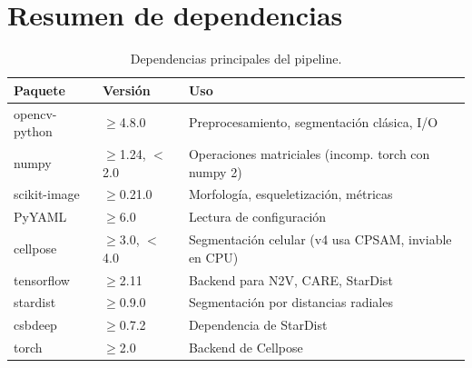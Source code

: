 \documentclass[11pt,a4paper]{article}
\begin{document}
\section{Resumen de dependencias}

\begin{table}[H]
\centering
\begin{tabular}{lll}
\toprule
\textbf{Paquete} & \textbf{Versi\'{o}n} & \textbf{Uso} \\
\midrule
opencv-python & $\geq$4.8.0 & Preprocesamiento, segmentaci\'{o}n cl\'{a}sica, I/O \\
numpy & $\geq$1.24, $<$2.0 & Operaciones matriciales (incomp. torch con numpy 2) \\
scikit-image & $\geq$0.21.0 & Morfolog\'{i}a, esqueletizaci\'{o}n, m\'{e}tricas \\
PyYAML & $\geq$6.0 & Lectura de configuraci\'{o}n \\
cellpose & $\geq$3.0, $<$4.0 & Segmentaci\'{o}n celular (v4 usa CPSAM, inviable en CPU) \\
tensorflow & $\geq$2.11 & Backend para N2V, CARE, StarDist \\
stardist & $\geq$0.9.0 & Segmentaci\'{o}n por distancias radiales \\
csbdeep & $\geq$0.7.2 & Dependencia de StarDist \\
torch & $\geq$2.0 & Backend de Cellpose \\
\bottomrule
\end{tabular}
\caption{Dependencias principales del pipeline.}
\end{table}
\end{document}
